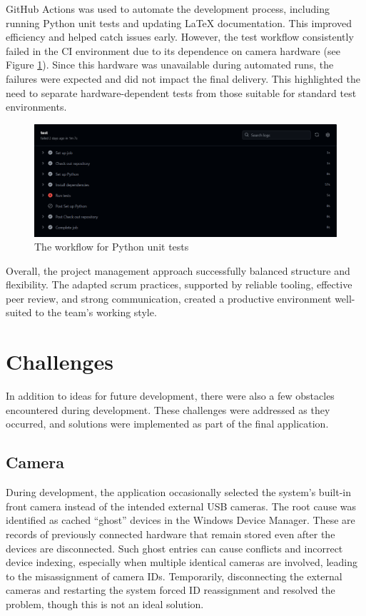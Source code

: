 GitHub Actions was used to automate the development process, including running Python unit tests and updating LaTeX documentation. This improved efficiency and helped catch issues early. However, the test workflow consistently failed in the CI environment due to its dependence on camera hardware (see Figure \ref{fig:workflow-test}). Since this hardware was unavailable during automated runs, the failures were expected and did not impact the final delivery. This highlighted the need to separate hardware-dependent tests from those suitable for standard test environments.\\

\begin{figure}[h!] \centering 
\includegraphics[width=0.75\linewidth]{figures/results/workflows/tests.png}\caption[Python tests workflow]{The workflow for Python unit tests}\label{fig:workflow-test} \end{figure}

Overall, the project management approach successfully balanced structure and flexibility. The adapted \gls{scrum} practices, supported by reliable tooling, effective peer review, and strong communication, created a productive environment well-suited to the team's working style. 

\section{Challenges}
In addition to ideas for future development, there were also a few obstacles encountered during development. These challenges were addressed as they occurred, and solutions were implemented as part of the final application. \\

\subsection{Camera}

During development, the application occasionally selected the system’s built-in front camera instead of the intended external USB cameras. The root cause was identified as cached “ghost” devices in the Windows Device Manager. These are records of previously connected hardware that remain stored even after the devices are disconnected. Such ghost entries can cause conflicts and incorrect device indexing, especially when multiple identical cameras are involved, leading to the misassignment of camera IDs. Temporarily, disconnecting the external cameras and restarting the system forced ID reassignment and resolved the problem, though this is not an ideal solution. \\

